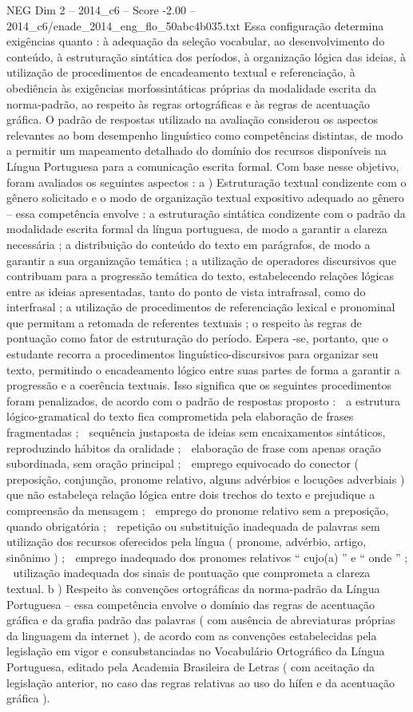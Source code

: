 \begin{textsample}{NEG Dim 2 – 2014\_c6 – Score -2.00 – 2014\_c6/enade\_2014\_eng\_flo\_50abc4b035.txt}
Essa configuração determina exigências quanto : à adequação da seleção vocabular, ao desenvolvimento do conteúdo, à estruturação sintática dos períodos, à organização lógica das ideias, à utilização de procedimentos de encadeamento textual e referenciação, à obediência às exigências morfossintáticas próprias da modalidade escrita da norma-padrão, ao respeito às regras ortográficas e às regras de acentuação gráfica.
O padrão de respostas utilizado na avaliação considerou os aspectos relevantes ao bom desempenho linguístico como competências distintas, de modo a permitir um mapeamento detalhado do domínio dos recursos disponíveis na Língua Portuguesa para a comunicação escrita formal.
Com base nesse objetivo, foram avaliados os seguintes aspectos : a ) Estruturação textual condizente com o gênero solicitado e o modo de organização textual expositivo adequado ao gênero – essa competência envolve : a estruturação sintática condizente com o padrão da modalidade escrita formal da língua portuguesa, de modo a garantir a clareza necessária ; a distribuição do conteúdo do texto em parágrafos, de modo a garantir a sua organização temática ; a utilização de operadores discursivos que contribuam para a progressão temática do texto, estabelecendo relações lógicas entre as ideias apresentadas, tanto do ponto de vista intrafrasal, como do interfrasal ; a utilização de procedimentos de referenciação lexical e pronominal que permitam a retomada de referentes textuais ; o respeito às regras de pontuação como fator de estruturação do período.
Espera -se, portanto, que o estudante recorra a procedimentos linguístico-discursivos para organizar seu texto, permitindo o encadeamento lógico entre suas partes de forma a garantir a progressão e a coerência textuais.
Isso significa que os seguintes procedimentos foram penalizados, de acordo com o padrão de respostas proposto :  a estrutura lógico-gramatical do texto fica comprometida pela elaboração de frases fragmentadas ;  sequência justaposta de ideias sem encaixamentos sintáticos, reproduzindo hábitos da oralidade ;  elaboração de frase com apenas oração subordinada, sem oração principal ;  emprego equivocado do conector ( preposição, conjunção, pronome relativo, alguns advérbios e locuções adverbiais ) que não estabeleça relação lógica entre dois trechos do texto e prejudique a compreensão da mensagem ;  emprego do pronome relativo sem a preposição, quando obrigatória ;  repetição ou substituição inadequada de palavras sem utilização dos recursos oferecidos pela língua ( pronome, advérbio, artigo, sinônimo ) ;  emprego inadequado dos pronomes relativos “ cujo(a) ” e “ onde ” ;  utilização inadequada dos sinais de pontuação que comprometa a clareza textual. b ) Respeito às convenções ortográficas da norma-padrão da Língua Portuguesa – essa competência envolve o domínio das regras de acentuação gráfica e da grafia padrão das palavras ( com ausência de abreviaturas próprias da linguagem da internet ), de acordo com as convenções estabelecidas pela legislação em vigor e consubstanciadas no Vocabulário Ortográfico da Língua Portuguesa, editado pela Academia Brasileira de Letras ( com aceitação da legislação anterior, no caso das regras relativas ao uso do hífen e da acentuação gráfica ).

\end{textsample}

